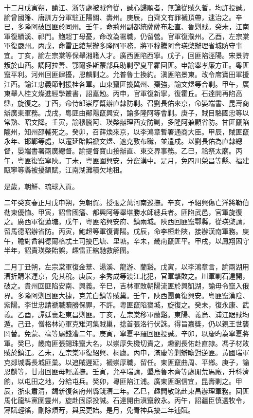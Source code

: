 \begin{pinyinscope}
十二月戊寅朔，諭江、浙等處被賊脅從，誠心歸順者，無論從賊久暫，均許投誠。諭曾國籓、唐訓方分軍駐正陽關、壽州。庚辰，白齊文有罪褫頂帶，逮治之。辛巳，多隆阿破回匪於同州。壬午，命荊州副都統薩薩布赴直、魯剿賊。癸未，江南軍復績溪、祁門。鮑超丁母憂，命改為署職，仍留營。官軍復濮州。乙酉，左宗棠軍復嚴州。丙戌，命雷正綰幫辦多隆阿軍務，將軍穆騰阿會瑛棨辦理省城防守事宜。丁亥，諭左宗棠等保舉湘籍人才。廣西匪陷西寧。戊子，回匪陷涇陽。宋景詩叛於山西。調阿拉善、鄂爾多斯蒙部兵助剿寧夏平羅回匪。申諭舉孝廉方正。粵匪竄平利。河州回匪肆擾，恩麟剿之。允普魯士換約。滇匪陷景東。改令席寶田軍援江西。諭江忠義節制援桂各軍。山東竄匪擾冀州、棗強，諭文煜等合剿。甲午，廣東舉人桂文燦進經學叢書，詔嘉勉。丙申，官軍復新寧，復霍丘。石達開再陷高縣，旋復之。丁酉，命侍郎崇厚幫辦直隸防剿。召劉長佑來京，命晏端書、昆壽商辦廣東軍務。戊戌，粵匪由鄖陽竄興安，諭多隆阿等會剿。庚子，賊目駱國忠等以常熟、昭文降。壬寅，諭穆騰阿、瑛棨辦理西安防剿，多隆阿兼顧省防。甘匪竄陷隴州，知州邵輔死之。癸卯，召薛煥來京，以李鴻章暫署通商大臣。甲辰，賊匪竄永年、邯鄲等處，以遷延貽誤褫文煜、遮克敦布職，並遣戍。以劉長佑為直隸總督，晏端書署兩廣總督。諭提督寶山接辦直、東交界事務。乙巳，祫祭太廟。丙午，粵匪復竄寧陜。丁未，粵匪圍興安，分竄漢中。是月，免四川榮昌等縣、福建甌寧等縣被擾額賦，江南湖灘積欠地租。

是歲，朝鮮、琉球入貢。

二年癸亥春正月戊申朔，免朝賀。授張之萬河南巡撫。辛亥，予紹興傷亡洋將勒伯勒東優恤。甲寅，詔曾國籓、都興阿等舉堪勝水師總兵者。匪陷武邑，官軍旋復之。廣西軍復蓮塘。戊午，粵匪陷興安府、鎮兩城。陜西回匪竄鄠縣，從瑛棨請，留馬德昭辦省防。丙寅，鮑超等軍復青陽。戊辰，命李桓赴陜，接辦漢南軍務。庚午，瞻對酋糾德爾格忒土司擾巴塘、里塘。辛未，畿南竄匪平。甲戌，以鳳翔困守半年，詔責瑛棨貽誤，趣雷正綰馳救解圍。

二月丁丑朔，左宗棠軍復金華、湯溪、龍游、蘭谿。戊寅，以李鴻章言，諭兩湖用漕折購米運京，免其稅。庚辰，李秀成等渡江北犯，官軍擊敗之。川軍剿石達開，破之。貴州回匪陷安南、興義。辛巳，吉林軍敗朝陽流匪於興凱湖，諭毋令竄入俄界。多隆阿剿回匪大捷，克羌白鎮等賊巢。壬午，陜西團勇復興安。粵匪竄漢陰、紫陽。李世忠請褫職贖勝保罪，不許。粵匪竄陷褒城，旋復之。癸未，復永康、武義。乙酉，譚廷襄赴東昌剿匪。丁亥，左宗棠移軍蘭谿。東陽、義烏、浦江踞賊均遁。己丑，僧格林沁軍克雉河集賊巢，捻首張洛行伏誅。得旨嘉獎，仍以親王世襲罔替。免蒙、亳等屬錢漕二年。庚寅，寧夏平羅回匪投誠。辛卯，以慶昀為寧夏將軍。癸巳，畿南匪張錫珠竄大名，以崇厚失機切責之，趣劉長佑赴直隸。馮子材敗賊於鎮江。乙未，左宗棠軍復紹興、桐廬。丙申，滿慶等剿辦瞻對逆匪。黃國瑞軍克郯城縣長城匪巢。以追賊遲延，褫崇厚職，留任。東匪竄曲周、平鄉。庚子，諭恩麟等，甘肅回匪毋輕議撫。壬寅，允平瑞請，墾烏魯木齊等處閒荒馬廠，升科濟餉，以屯田之地，分給屯兵。癸卯，粵匪陷江浦。廣東匪踞信宜，昆壽剿之。甲辰，浙東肅清，蠲新復各府州縣錢漕二年。乙巳，趣閻敬銘赴東昌辦理軍務。回匪馬化龍糾黨圍靈州，旋赴固原投誠。石達開由滇竄敘永。丙午，詔疆臣慎選牧令，薄賦輕徭，刪除煩苛，與民更始。是月，免青神兵擾二年逋賦。


\end{pinyinscope}
